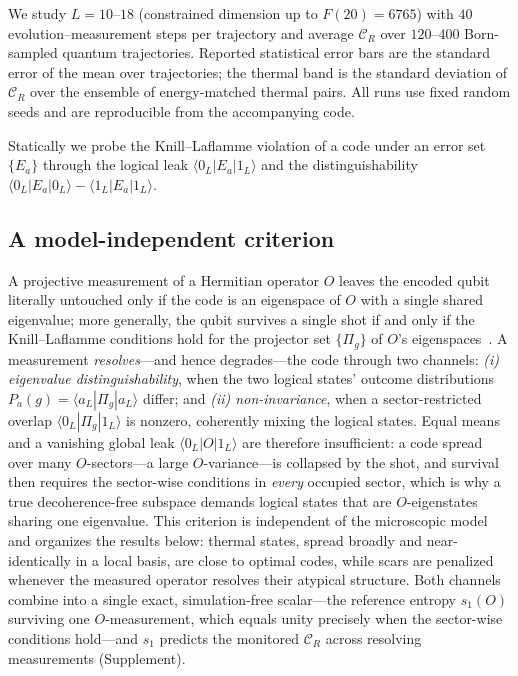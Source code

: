 \documentclass[aps,prxquantum,twocolumn,superscriptaddress,floatfix,longbibliography]{revtex4-2}
\newcommand{\CR}{\mathcal{C}_R}
\begin{document}
We study $L=10$--$18$ (constrained dimension up to $F(20)=6765$) with $40$
evolution--measurement steps per trajectory and average $\CR$ over $120$--$400$
Born-sampled quantum trajectories. Reported statistical error bars are the
standard error of the mean over trajectories; the thermal band is the standard
deviation of $\CR$ over the ensemble of energy-matched thermal pairs. All runs
use fixed random seeds and are reproducible from the accompanying code.

Statically we probe the Knill--Laflamme violation of a code under an error set
$\{E_a\}$ through the logical leak $\langle 0_L|E_a|1_L\rangle$ and the
distinguishability $\langle0_L|E_a|0_L\rangle-\langle1_L|E_a|1_L\rangle$.

\subsection{A model-independent criterion}
A projective measurement of a Hermitian operator $O$ leaves the encoded qubit
literally untouched only if the code is an eigenspace of $O$ with a single
shared eigenvalue; more generally, the qubit survives a single shot if and only
if the Knill--Laflamme conditions hold for the projector set $\{\Pi_g\}$ of
$O$'s eigenspaces~\cite{KnillLaflamme1997}. A measurement \emph{resolves}---and
hence degrades---the code through two channels: \emph{(i) eigenvalue
distinguishability}, when the two logical states' outcome distributions
$P_a(g)=\langle a_L|\Pi_g|a_L\rangle$ differ; and \emph{(ii) non-invariance},
when a sector-restricted overlap $\langle0_L|\Pi_g|1_L\rangle$ is nonzero,
coherently mixing the logical states. Equal means and a vanishing global leak
$\langle0_L|O|1_L\rangle$ are therefore insufficient: a code spread over many
$O$-sectors---a large $O$-variance---is collapsed by the shot, and survival then
requires the sector-wise conditions in \emph{every} occupied sector, which is
why a true decoherence-free subspace demands logical states that are
$O$-eigenstates sharing one eigenvalue. This criterion is independent of the
microscopic model and organizes the results below: thermal states, spread
broadly and near-identically in a local basis, are close to optimal codes,
while scars are penalized whenever the measured operator resolves their
atypical structure. Both channels combine into a single exact, simulation-free
scalar---the reference entropy $s_1(O)$ surviving one $O$-measurement, which
equals unity precisely when the sector-wise conditions hold---and $s_1$
predicts the monitored $\CR$ across resolving measurements (Supplement).
\end{document}
